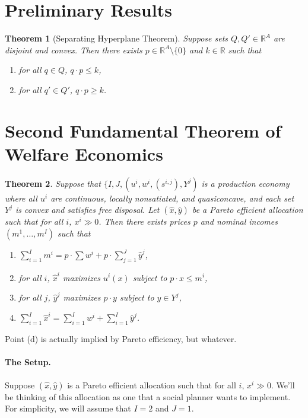 \documentclass[12pt]{article}
\newcommand{\R}{\mathbb{R}}
\newcommand{\sumi}{\sum_{i=1}^I}
\newcommand{\sumj}{\sum_{j=1}^J}
\newtheorem{theorem}{Theorem}
\theoremstyle{definition}
\begin{document}
\maketitle
\onehalfspace


\section*{Preliminary Results}

\begin{theorem}[Separating Hyperplane Theorem]
	Suppose sets $Q, Q' \in \R^A$ are disjoint and convex. Then there exists $p \in \R^A \setminus \{0\}$ and $k \in\R$ such that 
		\begin{enumerate}
			\item for all $q \in Q$, $q \cdot p \leq k$,
			\item for all $q' \in Q'$, $q \cdot p \geq k$. 
		\end{enumerate}
\end{theorem}



\section*{Second Fundamental Theorem of Welfare Economics}

\begin{theorem}
	Suppose that $\{I, J, (u^i, w^i, (s^{i,j}), Y^j )$ is a production economy where all $u^i$ are continuous, locally nonsatiated, and quasiconcave, and each set $Y^j$ is convex and satisfies free disposal.  Let $(\hat{x}, \hat{y})$ be a Pareto efficient allocation such that for all $i$, $x^i \gg0$. Then there exists prices $p$ and nominal incomes $(m^1, \hdots, m^I)$ such that 
	\begin{enumerate}
		\item $\sumi m^i = p \cdot \sum w^i + p  \cdot \sumj \hat{y}^j$,
		\item for all $i$, $\hat{x}^i$ maximizes $u^i(x)$ subject to $p  \cdot x \leq m^i$,
		\item for all $j$, $\hat{y}^j$ maximizes $p \cdot y$ subject to $y \in Y^j$,
		\item $\sumi \hat{x}^i = \sumi w^i + \sumi \hat{y}^j$.
	\end{enumerate}
\end{theorem}

Point (d) is actually implied by Pareto efficiency, but whatever. 


\paragraph{The Setup.} Suppose $(\hat{x}, \hat{y})$ is a Pareto efficient allocation such that for all $i$, $x^i \gg0$. We'll be thinking of this allocation as one that a social planner wants to implement. For simplicity, we will assume that $I=2$ and $J=1$. 
\end{document}
